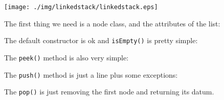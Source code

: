 \documentclass[a4paper, 9pt]{extarticle}
\begin{document}
\begin{center}
  \texttt{[image: ./img/linkedstack/linkedstack.eps]}
\end{center}

The first thing we need is a node class, and the attributes of the list:


The default constructor is ok and \verb+isEmpty()+ is pretty simple:


The \verb+peek()+ method is also very simple:


The \verb+push()+ method is just a line plus some exceptions:


The \verb+pop()+ is just removing the first node and returning its datum.

\end{document}
